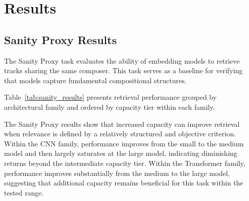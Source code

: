 \documentclass{article}
\begin{document}
\section{Results}\label{sec:results}\label{ch:results}
\subsection{Sanity Proxy Results}

The Sanity Proxy task evaluates the ability of embedding models to retrieve tracks sharing the same composer. This task serves as a baseline for verifying that models capture fundamental compositional structures.

Table~\ref{tab:sanity_results} presents retrieval performance grouped by architectural family and ordered by capacity tier within each family.

\begin{table}[!htbp]
\centering
\caption{Sanity Proxy Results (Composer Retrieval). Metrics reported are corpus-level mean values at rank 5.}
\label{tab:sanity_results}
\end{table}

The Sanity Proxy results show that increased capacity can improve retrieval when relevance is defined
by a relatively structured and objective criterion. Within the CNN family, performance improves from
the small to the medium model and then largely saturates at the large model, indicating diminishing
returns beyond the intermediate capacity tier. Within the Transformer family, performance improves
substantially from the medium to the large model, suggesting that additional capacity remains
beneficial for this task within the tested range.
\end{document}
